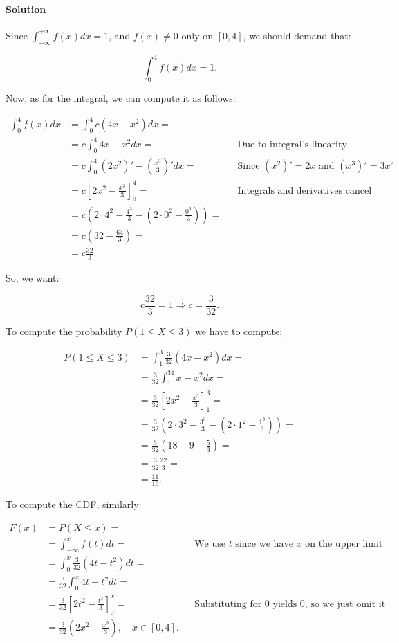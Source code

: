 \documentclass[
]{article}
\begin{document}
\paragraph{Solution}\label{solution}

Since \(\int_{-\infty}^{+\infty}f(x)dx=1\), and \(f(x)\neq0\) only on
\([0,4]\), we should demand that:

\[\int_0^4f(x)dx=1.\]

Now, as for the integral, we can compute it as follows:

\[\begin{aligned}
  \int_0^4f(x)dx&=\int_0^4 c(4x-x^2)dx=\\
  &=c\int_0^4 4x-x^2dx=&&\text{Due to integral's linearity}\\
  &=c\int_0^4 (2x^2)'-\left(\frac{x^3}{3}\right)'dx=&&\text{Since $(x^2)'=2x$ and $(x^3)'=3x^2$}\\
  &=c\left[2x^2-\frac{x^3}{3}\right]_0^4=&&\text{Integrals and derivatives cancel}\\
  &=c\left(2\cdot4^2-\frac{4^3}{3}-\left(2\cdot0^2-\frac{0^3}{3}\right)\right)=\\
  &=c\left(32-\frac{64}{3}\right)=\\
  &=c\frac{32}{3}.
\end{aligned}\]

So, we want:

\[c\frac{32}{3}=1\Rightarrow c=\frac{3}{32}.\]

To compute the probability \(P(1\leq X\leq 3)\) we have to compute;

\[\begin{aligned}
  P(1\leq X\leq 3)&=\int_1^3\frac{3}{32}(4x-x^2)dx=\\
  &=\frac{3}{32}\int_1^34x-x^2dx=\\
  &=\frac{3}{32}\left[2x^2-\frac{x^3}{3}\right]_1^3=\\
  &=\frac{3}{32}\left(2\cdot3^2-\frac{3^3}{3}-\left(2\cdot1^2-\frac{1^3}{3}\right)\right)=\\
  &=\frac{3}{32}\left(18-9-\frac{5}{3}\right)=\\
  &=\frac{3}{32}\frac{22}{3}=\\
  &=\frac{11}{16}.
\end{aligned}\]

To compute the CDF, similarly:

\[\begin{aligned}
  F(x)&=P(X\leq x)=\\
  &=\int_{-\infty}^xf(t)dt=&&\text{We use $t$ since we have $x$ on the upper limit}\\
  &=\int_0^x\frac{3}{32}(4t-t^2)dt=\\
  &=\frac{3}{32}\int_0^x4t-t^2dt=\\
  &=\frac{3}{32}\left[2t^2-\frac{t^3}{3}\right]_0^x=&&\text{Substituting for $0$ yields $0$, so we just omit it}\\
  &=\frac{3}{32}\left(2x^2-\frac{x^3}{3}\right),\quad x\in[0,4].
\end{aligned}\]
\end{document}
